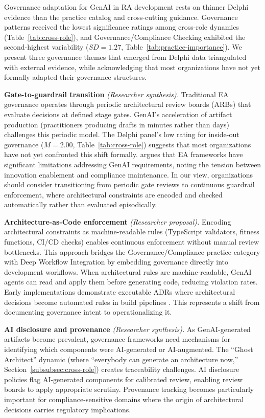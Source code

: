 Governance adaptation for GenAI in RA development rests on thinner Delphi
evidence than the practice catalog and cross-cutting guidance. Governance
patterns received the lowest significance ratings among cross-role dynamics
(Table~\ref{tab:cross-role}), and Governance/Compliance Checking exhibited the
second-highest variability ($SD = 1.27$,
Table~\ref{tab:practice-importance}). We present three governance themes that
emerged from Delphi data triangulated with external evidence, while
acknowledging that most organizations have not yet formally adapted their
governance structures.

\textbf{Gate-to-guardrail transition} \textit{(Researcher synthesis).} Traditional EA governance operates through
periodic architectural review boards (ARBs) that evaluate decisions at defined
stage gates. GenAI's acceleration of artifact production (practitioners producing
drafts in minutes rather than days) challenges this periodic model. The Delphi
panel's low rating for inside-out governance ($M = 2.00$,
Table~\ref{tab:cross-role}) suggests that most organizations have not yet
confronted this shift formally. \textcite{ettinger_ea_dynamic_capability_2025}
argues that EA frameworks have significant limitations addressing GenAI
requirements, noting the tension between innovation enablement and compliance
maintenance. In our view, organizations should consider transitioning from
periodic gate reviews to continuous guardrail enforcement, where architectural
constraints are encoded and checked automatically rather than evaluated
episodically.

\textbf{Architecture-as-Code enforcement} \textit{(Researcher proposal).} Encoding architectural constraints as
machine-readable rules (TypeScript validators, fitness functions, CI/CD
checks) enables continuous enforcement without manual review bottlenecks. This
approach bridges the Governance/Compliance practice category with Deep Workflow
Integration by embedding governance directly into development workflows. When
architectural rules are machine-readable, GenAI agents can read and apply them
before generating code, reducing violation rates. Early implementations
demonstrate executable ADRs where architectural decisions become automated
rules in build pipelines \parencite{ford_evolutionary_architectures_2023, zdun_sustainable_decisions_2013}. This represents a shift from
documenting governance intent to operationalizing it.

\textbf{AI disclosure and provenance} \textit{(Researcher synthesis).} As GenAI-generated artifacts become
prevalent, governance frameworks need mechanisms for identifying which
components were AI-generated or AI-augmented. The ``Ghost Architect''
dynamic (where ``everybody can generate an architecture now,''
Section~\ref{subsubsec:cross-role}) creates traceability challenges. AI
disclosure policies flag AI-generated components for calibrated review,
enabling review boards to apply appropriate scrutiny. Provenance tracking
becomes particularly important for compliance-sensitive domains where the
origin of architectural decisions carries regulatory implications.


